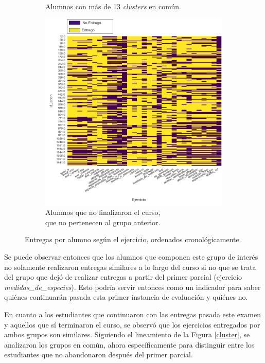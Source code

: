 \documentclass[11pt,a4paper,twoside,openany]{tesis}
\begin{document}
\begin{figure}[H]
\begin{subfigure}[t]{0.3\textwidth}
        \caption{Alumnos con más de 13 \emph{clusters} en común.}
        \label{fig:clique}
    \end{subfigure}
    \hfill
    \begin{subfigure}[t]{0.3\textwidth}
        \centering
        \includegraphics[width=\linewidth]{imagenes/entregas - no-clique13.png}
        \caption{Alumnos que no finalizaron el curso,\\que no pertenecen al grupo anterior.}
        \label{fig:noclique}
    \end{subfigure}
    \caption{Entregas por alumno según el ejercicio, ordenados cronológicamente.}
    \label{fig:figuras_juntas}
\end{figure}

Se puede observar entonces que los alumnos que componen este grupo de interés no solamente realizaron entregas similares a lo largo del curso si no que se trata del grupo que dejó de realizar entregas a partir del primer parcial (ejercicio \emph{medidas\_de\_especies}). Esto podría servir entonces como un indicador para saber quiénes continuarán pasada esta primer instancia de evaluación y quiénes no.

En cuanto a los estudiantes que continuaron con las entregas pasada este examen y aquellos que sí terminaron el curso, se observó que los ejercicios entregados por ambos grupos son similares. Siguiendo el lineamiento de la Figura \ref {cluster}, se analizaron los grupos en común, ahora específicamente para distinguir entre los estudiantes que no abandonaron después del primer parcial.
\end{document}
